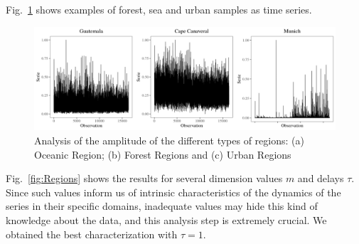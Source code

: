 \documentclass{isprs}
\begin{document}


Fig.~\ref{fig:AmplitudeSAR} shows examples of forest, sea and urban samples as time series.

\begin{figure}[hbt]
	\includegraphics[width=\columnwidth]{Figures/SAR_signal.pdf}
	\caption{Analysis of the amplitude of the different types of regions: (a) Oceanic Region; (b) Forest Regions and (c) Urban Regions}
	\label{fig:AmplitudeSAR}
\end{figure}


Fig.~\ref{fig:Regions} shows the results for several dimension values $m$ and delays $\tau$.
Since such values inform us of intrinsic characteristics of the dynamics of the series in their specific domains, inadequate values may hide this kind of knowledge about the data, and this analysis step is extremely crucial.
We obtained the best characterization with $\tau = 1$.
\end{document}

